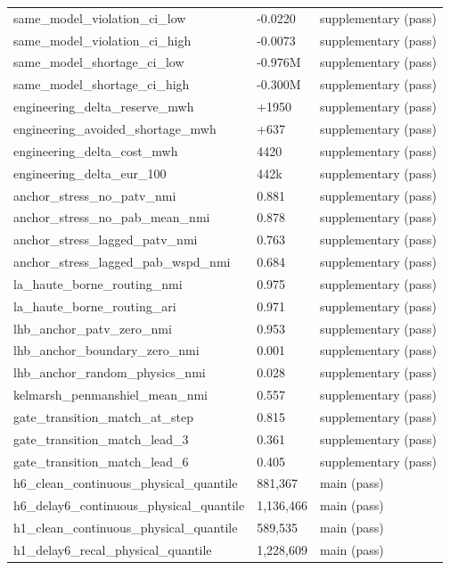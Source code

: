 \begin{table}[H]
\begin{tabular}{lll}
same\_model\_violation\_ci\_low & -0.0220 & supplementary (pass) \\
same\_model\_violation\_ci\_high & -0.0073 & supplementary (pass) \\
same\_model\_shortage\_ci\_low & -0.976M & supplementary (pass) \\
same\_model\_shortage\_ci\_high & -0.300M & supplementary (pass) \\
engineering\_delta\_reserve\_mwh & +1950 & supplementary (pass) \\
engineering\_avoided\_shortage\_mwh & +637 & supplementary (pass) \\
engineering\_delta\_cost\_mwh & 4420 & supplementary (pass) \\
engineering\_delta\_eur\_100 & 442k & supplementary (pass) \\
anchor\_stress\_no\_patv\_nmi & 0.881 & supplementary (pass) \\
anchor\_stress\_no\_pab\_mean\_nmi & 0.878 & supplementary (pass) \\
anchor\_stress\_lagged\_patv\_nmi & 0.763 & supplementary (pass) \\
anchor\_stress\_lagged\_pab\_wspd\_nmi & 0.684 & supplementary (pass) \\
la\_haute\_borne\_routing\_nmi & 0.975 & supplementary (pass) \\
la\_haute\_borne\_routing\_ari & 0.971 & supplementary (pass) \\
lhb\_anchor\_patv\_zero\_nmi & 0.953 & supplementary (pass) \\
lhb\_anchor\_boundary\_zero\_nmi & 0.001 & supplementary (pass) \\
lhb\_anchor\_random\_physics\_nmi & 0.028 & supplementary (pass) \\
kelmarsh\_penmanshiel\_mean\_nmi & 0.557 & supplementary (pass) \\
gate\_transition\_match\_at\_step & 0.815 & supplementary (pass) \\
gate\_transition\_match\_lead\_3 & 0.361 & supplementary (pass) \\
gate\_transition\_match\_lead\_6 & 0.405 & supplementary (pass) \\
h6\_clean\_continuous\_physical\_quantile & 881{,}367 & main (pass) \\
h6\_delay6\_continuous\_physical\_quantile & 1{,}136{,}466 & main (pass) \\
h1\_clean\_continuous\_physical\_quantile & 589{,}535 & main (pass) \\
h1\_delay6\_recal\_physical\_quantile & 1{,}228{,}609 & main (pass) \\

\end{tabular}
\end{table}
